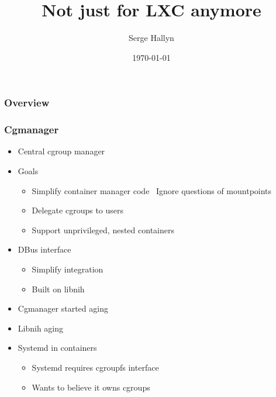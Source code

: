 \documentclass{beamer}
\title[LXCFS]{Not just for LXC anymore} %
\author{Serge Hallyn} %
\date{\today} %
\begin{document}
\begin{frame}
\titlepage %
\end{frame}

\begin{frame}
\frametitle{Overview} %
\tableofcontents %
\end{frame}

\begin{frame}[fragile]
\frametitle{Cgmanager}
	\begin{itemize}
	\item Central cgroup manager
	\item Goals
		\begin{itemize}
		\item Simplify container manager code \
			Ignore questions of mountpoints
		\item Delegate cgroups to users
		\item Support unprivileged, nested containers
		\end{itemize}
	\item DBus interface
		\begin{itemize}
		\item Simplify integration
		\item Built on libnih
		\end{itemize}
\pause

	\item Cgmanager started aging
	\item Libnih aging
	\item Systemd in containers
		\begin{itemize}
		\item Systemd requires cgroupfs interface
		\item Wants to believe it owns cgroups
		\end{itemize}
	\end{itemize}
\end{frame}
\end{document}
